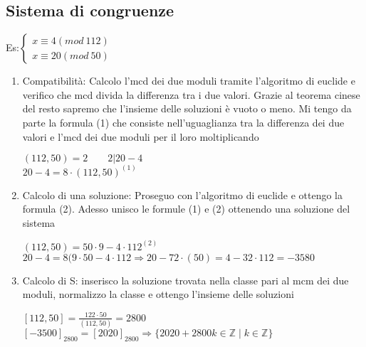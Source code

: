\documentclass[11pt, letterpaper]{article}
\begin{document}
\subsection{Sistema di congruenze}
Es:$\begin{cases}
    x\equiv 4 (mod\ 112)\\
    x\equiv 20 (mod\ 50)
\end{cases}$
\begin{enumerate}
    \item Compatibilità: Calcolo l'mcd dei due moduli tramite l'algoritmo di euclide e 
    verifico che mcd divida la differenza tra i due valori. Grazie al teorema cinese del resto
    sapremo che l'insieme delle soluzioni è vuoto o meno. Mi tengo da parte la formula (1) che
    consiste nell'uguaglianza tra la differenza dei due valori e l'mcd dei due moduli per il loro 
    moltiplicando
    \begin{center}
        $(112,50)=2\qquad 2|20-4$\\
        $20-4=8\cdot(112,50)^{(1)}$
    \end{center}
    \item Calcolo di una soluzione: Proseguo con l'algoritmo di euclide e ottengo la formula (2).
    Adesso unisco le formule (1) e (2) ottenendo una soluzione del sistema
    \begin{center}
        $(112,50)=50\cdot 9 - 4\cdot 112^{(2)}$\\
        $20-4=8(9\cdot 50-4\cdot 112\Rightarrow 20-72\cdot(50)=4-32\cdot 112=-3580$
    \end{center}
    \item Calcolo di S: inserisco la soluzione trovata nella classe pari al mcm dei due moduli,
    normalizzo la classe e ottengo l'insieme delle soluzioni
    \begin{center}
        $[112,50]=\frac{122\cdot 50}{(112,50)}=2800$\\
        $[-3500]_{2800}=[2020]_{2800}\Rightarrow\{2020+2800k\in\mathbb{Z}\mid k\in\mathbb{Z}\}$
    \end{center}
\end{enumerate}
\end{document}
